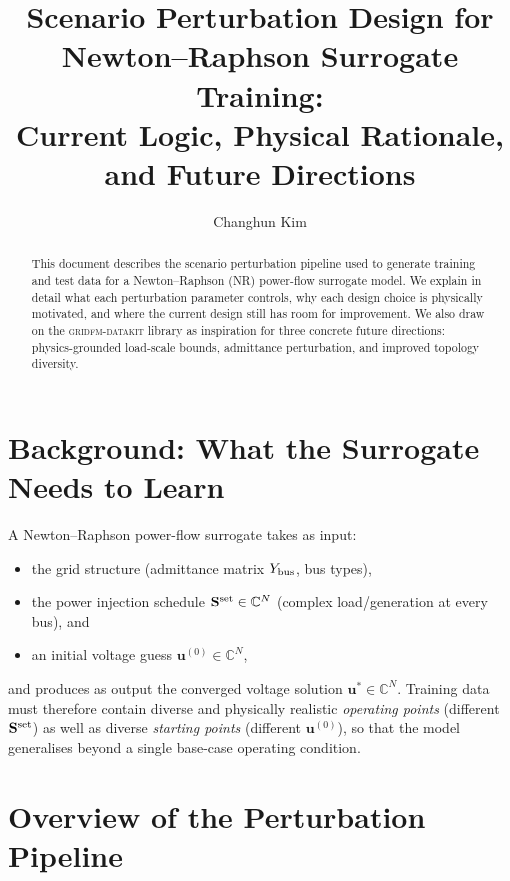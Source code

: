 \documentclass{article}
\title{Scenario Perturbation Design for Newton--Raphson Surrogate Training:\\
  Current Logic, Physical Rationale, and Future Directions}
\author{Changhun Kim}
\begin{document}
\maketitle

\begin{abstract}
This document describes the scenario perturbation pipeline used to generate
training and test data for a Newton--Raphson (NR) power-flow surrogate model.
We explain in detail what each perturbation parameter controls, why each design
choice is physically motivated, and where the current design still has room for
improvement.  We also draw on the \textsc{gridfm-datakit} library
\cite{gridfm2024} as inspiration for three concrete future directions:
physics-grounded load-scale bounds, admittance perturbation, and improved
topology diversity.
\end{abstract}

\section{Background: What the Surrogate Needs to Learn}

A Newton--Raphson power-flow surrogate takes as input:
\begin{itemize}[noitemsep]
  \item the grid structure (admittance matrix $Y_{\rm bus}$, bus types),
  \item the power injection schedule $\mathbf{S}^{\rm set} \in \mathbb{C}^N$
        (complex load/generation at every bus), and
  \item an initial voltage guess $\mathbf{u}^{(0)} \in \mathbb{C}^N$,
\end{itemize}
and produces as output the converged voltage solution
$\mathbf{u}^* \in \mathbb{C}^N$.
Training data must therefore contain diverse and physically realistic
\emph{operating points} (different $\mathbf{S}^{\rm set}$) as well as diverse
\emph{starting points} (different $\mathbf{u}^{(0)}$), so that the model
generalises beyond a single base-case operating condition.

\section{Overview of the Perturbation Pipeline}
\end{document}
